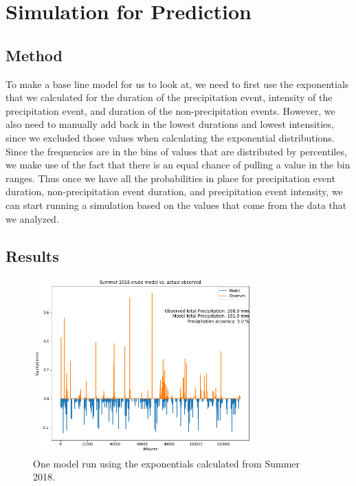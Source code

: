 \documentclass[11pt]{report}
\begin{document}
\section{Simulation for Prediction}\label{sec:sfp}

\subsection{Method}\label{sec:sfp_m}
To make a base line model for us to look at, we need to first use the exponentials that we calculated for the duration of the precipitation event, intensity of the precipitation event, and duration of the non-precipitation events. However, we also need to manually add back in the lowest durations and lowest intensities, since we excluded those values when calculating the exponential distributions. Since the frequencies are in the bins of values that are distributed by percentiles, we make use of the fact that there is an equal chance of pulling a value in the bin ranges. Thus once we have all the probabilities in place for precipitation event duration, non-precipitation event duration, and precipitation event intensity, we can start running a simulation based on the values that come from the data that we analyzed. 
\\ 

\clearpage 

\subsection{Results}\label{sec:sfp_r}


\begin{figure}[t]
  \centering
  \includegraphics[width=0.75\textwidth]{Figures/better_one_run.png}
  \caption[One run using Summer 2018 climatology]

  {\label{crudemodel}One model run using the exponentials calculated from Summer 2018.}
\end{figure}
\end{document}
